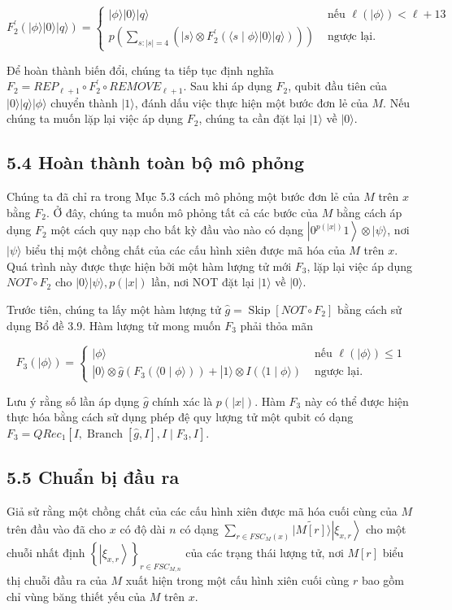 \documentclass[10pt]{article}
\begin{document}
$$
F_{2}^{\prime}(|\phi\rangle|0\rangle|q\rangle)= \begin{cases}|\phi\rangle|0\rangle|q\rangle & \text { nếu } \ell(|\phi\rangle)<\ell+13 \\ p\left(\sum_{s:|s|=4}\left(|s\rangle \otimes F_{2}^{\prime}(\langle s \mid \phi\rangle|0\rangle|q\rangle)\right)\right) & \text { ngược lại. }\end{cases}
$$

Để hoàn thành biến đổi, chúng ta tiếp tục định nghĩa $F_{2}=R E P_{\ell+1} \circ F_{2}^{\prime} \circ R E M O V E_{\ell+1}$. Sau khi áp dụng $F_{2}$, qubit đầu tiên của $|0\rangle|q\rangle|\phi\rangle$ chuyển thành $|1\rangle$, đánh dấu việc thực hiện một bước đơn lẻ của $M$. Nếu chúng ta muốn lặp lại việc áp dụng $F_{2}$, chúng ta cần đặt lại $|1\rangle$ về $|0\rangle$.

\subsection*{5.4 Hoàn thành toàn bộ mô phỏng}
Chúng ta đã chỉ ra trong Mục 5.3 cách mô phỏng một bước đơn lẻ của $M$ trên $x$ bằng $F_{2}$. Ở đây, chúng ta muốn mô phỏng tất cả các bước của $M$ bằng cách áp dụng $F_{2}$ một cách quy nạp cho bất kỳ đầu vào nào có dạng $\left|0^{p(|x|)} 1\right\rangle \otimes|\psi\rangle$, nơi $|\psi\rangle$ biểu thị một chồng chất của các cấu hình xiên được mã hóa của $M$ trên $x$. Quá trình này được thực hiện bởi một hàm lượng tử mới $F_{3}$, lặp lại việc áp dụng $N O T \circ F_{2}$ cho $|0\rangle|\psi\rangle, p(|x|)$ lần, nơi NOT đặt lại $|1\rangle$ về $|0\rangle$.

Trước tiên, chúng ta lấy một hàm lượng tử $\hat{g}=\operatorname{Skip}\left[N O T \circ F_{2}\right]$ bằng cách sử dụng Bổ đề 3.9. Hàm lượng tử mong muốn $F_{3}$ phải thỏa mãn

$$
F_{3}(|\phi\rangle)= \begin{cases}|\phi\rangle & \text { nếu } \ell(|\phi\rangle) \leq 1 \\ |0\rangle \otimes \hat{g}\left(F_{3}(\langle 0 \mid \phi\rangle)\right)+|1\rangle \otimes I(\langle 1 \mid \phi\rangle) & \text { ngược lại. }\end{cases}
$$

Lưu ý rằng số lần áp dụng $\hat{g}$ chính xác là $p(|x|)$. Hàm $F_{3}$ này có thể được hiện thực hóa bằng cách sử dụng phép đệ quy lượng tử một qubit có dạng $F_{3}=Q R e c_{1}\left[I, \operatorname{Branch}[\hat{g}, I], I \mid F_{3}, I\right]$.

\subsection*{5.5 Chuẩn bị đầu ra}
Giả sử rằng một chồng chất của các cấu hình xiên được mã hóa cuối cùng của $M$ trên đầu vào đã cho $x$ có độ dài $n$ có dạng $\sum_{r \in F S C_{M}(x)}|\widetilde{M[r]}\rangle\left|\xi_{x, r}\right\rangle$ cho một chuỗi nhất định $\left\{\left|\xi_{x, r}\right\rangle\right\}_{r \in F S C_{M, n}}$ của các trạng thái lượng tử, nơi $M[r]$ biểu thị chuỗi đầu ra của $M$ xuất hiện trong một cấu hình xiên cuối cùng $r$ bao gồm chỉ vùng băng thiết yếu của $M$ trên $x$.
\end{document}
